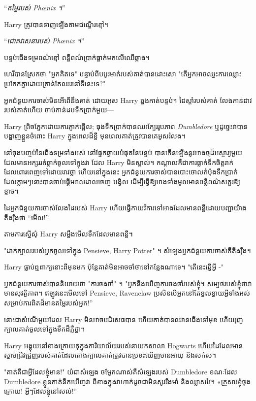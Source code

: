 {“\emph{តម្លៃរបស់ Phœnix ។}”

Harry ត្រូវបានទាញឡើងតាមជណ្តើរខ្មៅ។

“\emph{ជោគវាសនារបស់ Phœnix ។}”

បន្ទប់​ជើង​ទម្រ​ពណ៌​ខ្មៅ ពន្លឺ​ពណ៌​ប្រាក់​ធ្លាក់​មក​លើ​ឈើ​ឆ្កាង។

ហេរីបានស្រែកថា "អ្នកគិតទេ" បន្ទាប់ពីបបូរមាត់របស់គាត់បានដោះសោ "តើអ្នកអាចឈ្នះការឈ្លោះប្រកែកគ្នាដោយគ្រាន់តែឈរនៅទីនេះទេ?"

អ្នកជំនួយការចាស់មិនអើពើនឹងគាត់ ដោយអូស Harry ឆ្លងកាត់បន្ទប់។ ដៃស្តាំរបស់គាត់ លែងកាន់ដាវរបស់គាត់ហើយ ចាប់កាន់ដបទឹកប្រាក់មួយ—

Harry ព្រិចភ្នែកដោយការភ្ញាក់ផ្អើល; ធុងទឹកប្រាក់បានឈរក្បែររូបភាព \emph{Dumbledore} ឬដូច្នេះវាបានបង្ហាញខ្លួនចំពោះ Harry ក្នុងពេលដ៏ខ្លី មុនពេលគាត់ត្រូវបានគេអូសរំលង។

នៅចុងបញ្ចប់នៃជើងទម្រទាំងអស់ នៅផ្នែកឆ្ងាយបំផុតនៃបន្ទប់ បានកើនឡើងនូវអាងថ្មដ៏អស្ចារ្យមួយដែលមានអក្សររត់ឆ្លាក់ចូលទៅក្នុងវា ដែល Harry មិនស្គាល់។ កណ្តាលគឺជាការធ្លាក់ទឹកចិត្តរាក់ដែលពោរពេញទៅដោយរាវថ្លា ហើយនៅក្នុងនេះ អ្នកជំនួយការចាស់បានបោះចោលកំប៉ុងទឹកប្រាក់ ដែលភ្លាមៗនោះបានចាប់ផ្តើមរាលដាលចេញ បង្វិល ដើម្បីធ្វើឱ្យអាងទាំងមូលមានពន្លឺពណ៌សគួរឱ្យខ្លាច។

ដៃ​អ្នក​ជំនួយការ​ចាស់​លែង​ដៃ​របស់ Harry ហើយ​ធ្វើ​កាយវិការ​ទៅ​អាង​ដែល​មាន​ពន្លឺ​ដោយ​បញ្ជា​យ៉ាង​តឹងរ៉ឹង​ថា “មើល!”

តាម​ការ​ស្នើ​សុំ Harry សម្លឹង​មើល​ទឹក​ដែល​មាន​ពន្លឺ។

"ដាក់ក្បាលរបស់អ្នកចូលទៅក្នុង Pensieve, Harry Potter" ។ សំឡេង​អ្នក​ជំនួយការ​ចាស់​គឺ​តឹងរ៉ឹង។

Harry ធ្លាប់​ឮ​ពាក្យ​នោះ​ពីមុន​មក ប៉ុន្តែ​គាត់​មិន​អាច​ចាំ​ថា​នៅ​កន្លែង​ណា​ទេ។ "តើនេះធ្វើអ្វី -"

អ្នកជំនួយការចាស់បាននិយាយថា "ការចងចាំ" ។ "អ្នកនឹងឃើញការចងចាំរបស់ខ្ញុំ។ សម្បថរបស់ខ្ញុំថាវាមានសុវត្ថិភាព។ ឥឡូវនេះមើលទៅ Pensieve, Ravenclaw ប្រសិនបើអ្នកនៅតែខ្វល់ខ្វាយអ្វីទាំងអស់សម្រាប់ការពិតដ៏មានតម្លៃរបស់អ្នក!”

នោះ​ជា​សំណើ​មួយ​ដែល Harry មិន​អាច​បដិសេធ​បាន ហើយ​គាត់​បាន​ឈាន​ជើង​ទៅ​មុខ ហើយ​រុញ​ក្បាល​គាត់​ចូល​ទៅ​ក្នុង​ទឹក​ដ៏​ភ្លឺ​ថ្លា។

\later

\begin{em}
Harry អង្គុយ​នៅ​ខាងក្រោយ​តុ​ក្នុង​ការិយាល័យ​របស់​នាយក​សាលា Hogwarts ហើយ​ដៃ​ដែល​មាន​ស្នាម​ជ្រីវជ្រួញ​របស់​គាត់​ដែល​តោង​ក្បាល​គាត់​ត្រូវ​បាន​ប្រទះ​ឃើញ​មាន​អាយុ និង​សក់​ស។

"គាត់គឺជាអ្វីដែលខ្ញុំមាន!" យំ​ជា​សំឡេង ចម្លែក​ណាស់​គឺ​សំឡេង​របស់ Dumbledore ខណៈ​ដែល Dumbledore ខ្លួន​គាត់​នឹក​ឃើញ​វា ពី​ខាង​ក្នុង​វា​ហាក់​ដូច​ជា​មិន​សូវ​រឹង​មាំ និង​ឈ្លាស​វៃ។ «គ្រួសារខ្ញុំចុងក្រោយ! អ្វីៗដែលខ្ញុំនៅសល់!”


\end{em}}
